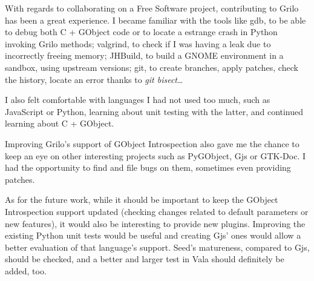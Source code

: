 With regards to collaborating on a Free Software project, contributing to Grilo has
been a great experience. I became familiar with the tools like gdb, to be able to debug
both C + GObject code or to locate a estrange crash in Python invoking Grilo methods;
valgrind, to check if I was having a leak due to incorrectly freeing memory; JHBuild, to
build a GNOME environment in a sandbox, using upstream versions; git, to create branches,
apply patches, check the history, locate an error thanks to {\it git bisect}\dots

I also felt comfortable with languages I had not used too much, such as JavaScript or Python,
learning about unit testing with the latter, and continued learning about C + GObject.

Improving Grilo's support of GObject Introspection also gave me the chance to keep
an eye on other interesting projects such as PyGObject, Gjs or GTK-Doc. I had the opportunity
to find and file bugs on them, sometimes even providing patches.

As for the future work, while it should be important to keep the GObject Introspection support
updated (checking changes related to default parameters or new features), it would also be
interesting to provide new plugins. Improving the existing Python unit tests would be useful
and creating Gjs' ones would allow a better evaluation of that language's support. Seed's
matureness, compared to Gjs, should be checked, and a better and larger test in Vala should
definitely be added, too.
